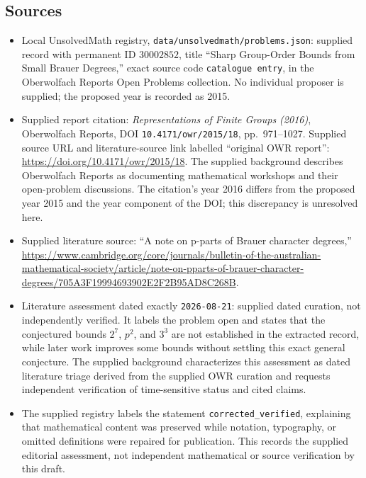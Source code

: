 \documentclass[11pt]{article}
\begin{document}
\subsection{Sources}
\begin{itemize}
\item Local UnsolvedMath registry, \texttt{data/unsolvedmath/problems.json}: supplied record with permanent ID \(30002852\), title ``Sharp Group-Order Bounds from Small Brauer Degrees,'' exact source code \texttt{catalogue entry}, in the Oberwolfach Reports Open Problems collection. No individual proposer is supplied; the proposed year is recorded as 2015.
\item Supplied report citation: \emph{Representations of Finite Groups (2016)}, Oberwolfach Reports, DOI \texttt{10.4171/owr/2015/18}, pp.\ 971--1027. Supplied source URL and literature-source link labelled ``original OWR report'': \url{https://doi.org/10.4171/owr/2015/18}. The supplied background describes Oberwolfach Reports as documenting mathematical workshops and their open-problem discussions. The citation's year 2016 differs from the proposed year 2015 and the year component of the DOI; this discrepancy is unresolved here.
\item Supplied literature source: ``A note on p-parts of Brauer character degrees,'' \url{https://www.cambridge.org/core/journals/bulletin-of-the-australian-mathematical-society/article/note-on-pparts-of-brauer-character-degrees/705A3F19994693902E2F2B95AD8C268B}.
\item Literature assessment dated exactly \texttt{2026-08-21}: supplied dated curation, not independently verified. It labels the problem open and states that the conjectured bounds \(2^7\), \(p^2\), and \(3^3\) are not established in the extracted record, while later work improves some bounds without settling this exact general conjecture. The supplied background characterizes this assessment as dated literature triage derived from the supplied OWR curation and requests independent verification of time-sensitive status and cited claims.
\item The supplied registry labels the statement \texttt{corrected\_verified}, explaining that mathematical content was preserved while notation, typography, or omitted definitions were repaired for publication. This records the supplied editorial assessment, not independent mathematical or source verification by this draft.
\end{itemize}
\end{document}
